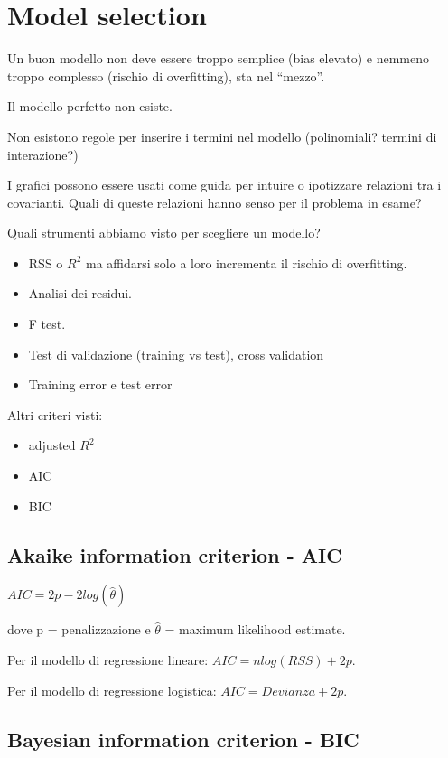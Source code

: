 \section{Model selection}

Un buon modello non deve essere troppo semplice (bias elevato) e nemmeno
troppo complesso (rischio di overfitting), sta nel ``mezzo''.

Il modello perfetto non esiste.

Non esistono regole per inserire i termini nel modello (polinomiali?
termini di interazione?)

I grafici possono essere usati come guida per intuire o ipotizzare relazioni
tra i covarianti. Quali di queste relazioni hanno senso per il problema in esame?

Quali strumenti abbiamo visto per scegliere un modello?

\begin{itemize}
 \item RSS o $R^2$ ma affidarsi solo a loro incrementa il rischio di overfitting.
 \item Analisi dei residui.
 \item F test.
 \item Test di validazione (training vs test), cross validation
 \item Training error e test error
\end{itemize}

Altri criteri visti:

\begin{itemize}
 \item adjusted $R^2$
 \item AIC
 \item BIC
\end{itemize}

\subsection{Akaike information criterion - AIC}

$AIC = 2p - 2log(\hat{\theta})$

dove p = penalizzazione e $\hat{\theta}$ = maximum likelihood estimate.

Per il modello di regressione lineare: $AIC = nlog(RSS) + 2p$.

Per il modello di regressione logistica: $AIC = Devianza + 2p$.

\subsection{Bayesian information criterion - BIC}

